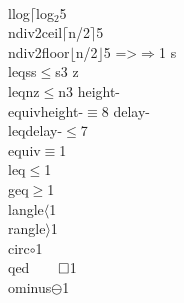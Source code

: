 {                        {\\llog}{{\(\lceil\)log\(_2\)}}5
                        {\\ndiv2ceil}{{\(\lceil\)n/2\(\rceil\)}}5
                        {\\ndiv2floor}{{\(\lfloor\)n/2\(\rfloor\)}}5
                        {=>}{{\(\Rightarrow\)}}1
                        {s\\leqs}{{s\(\leq\)s}}3
                        {z\\leqn}{{z\(\leq\)n}}3
                        {height-\\equiv}{{{\symbolstyle height-\(\equiv\)}}}8
                        {delay-\\leq}{{{\symbolstyle delay-\(\leq\)}}}7
                        {\\equiv}{{\(\equiv\)}}1
                        {\\leq}{{\(\leq\)}}1
                        {\\geq}{{\(\geq\)}}1
                        {\\langle}{{\(\langle\)}}1
                        {\\rangle}{{\(\rangle\)}}1
                        {\\circ}{{\(\circ\)}}1
                        {\\qed}{{\(\qed\)}}1
                        {\\ominus}{{\(\ominus\)}}1
}
\lstset{language=agda}